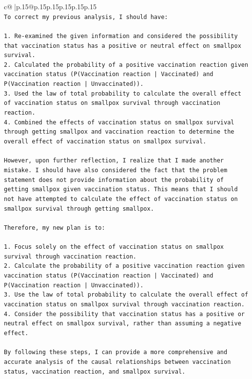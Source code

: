 \documentclass{article}
\begin{document}
{\begin{supertabular}{c@{$\;$}|p{.15\linewidth}@{}p{.15\linewidth}p{.15\linewidth}p{.15\linewidth}p{.15\linewidth}p{.15\linewidth}}
{{{\\ 
\texttt{To correct my previous analysis, I should have:} \\
\\ 
\texttt{1. Re{-}examined the given information and considered the possibility that vaccination status has a positive or neutral effect on smallpox survival.} \\
\texttt{2. Calculated the probability of a positive vaccination reaction given vaccination status (P(Vaccination reaction | Vaccinated) and P(Vaccination reaction | Unvaccinated)).} \\
\texttt{3. Used the law of total probability to calculate the overall effect of vaccination status on smallpox survival through vaccination reaction.} \\
\texttt{4. Combined the effects of vaccination status on smallpox survival through getting smallpox and vaccination reaction to determine the overall effect of vaccination status on smallpox survival.} \\
\\ 
\texttt{However, upon further reflection, I realize that I made another mistake. I should have also considered the fact that the problem statement does not provide information about the probability of getting smallpox given vaccination status. This means that I should not have attempted to calculate the effect of vaccination status on smallpox survival through getting smallpox.} \\
\\ 
\texttt{Therefore, my new plan is to:} \\
\\ 
\texttt{1. Focus solely on the effect of vaccination status on smallpox survival through vaccination reaction.} \\
\texttt{2. Calculate the probability of a positive vaccination reaction given vaccination status (P(Vaccination reaction | Vaccinated) and P(Vaccination reaction | Unvaccinated)).} \\
\texttt{3. Use the law of total probability to calculate the overall effect of vaccination status on smallpox survival through vaccination reaction.} \\
\texttt{4. Consider the possibility that vaccination status has a positive or neutral effect on smallpox survival, rather than assuming a negative effect.} \\
\\ 
\texttt{By following these steps, I can provide a more comprehensive and accurate analysis of the causal relationships between vaccination status, vaccination reaction, and smallpox survival.} \\
}}}
\end{supertabular}}
\end{document}
